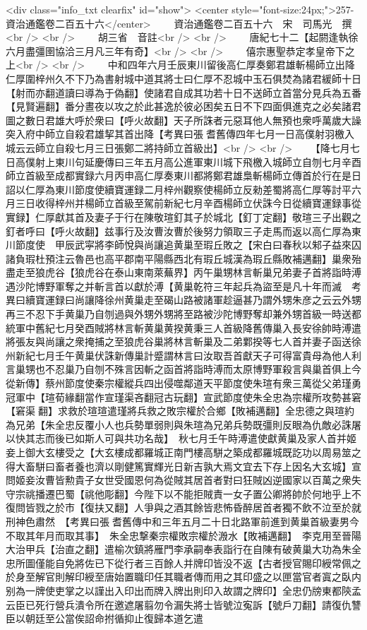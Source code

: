 <div class="info_txt clearfix" id="show">
<center style="font-size:24px;">257-資治通鑑卷二百五十六</center>
  　　資治通鑑卷二百五十六　宋　司馬光　撰<br />
<br />
　　胡三省　音註<br />
<br />
　　唐紀七十二【起閼逢執徐六月盡彊圉協洽三月凡三年有奇】<br />
<br />
　　僖宗惠聖恭定孝皇帝下之上<br />
<br />
　　中和四年六月壬辰東川留後高仁厚奏鄭君雄斬楊師立出降仁厚圍梓州久不下乃為書射城中道其將士曰仁厚不忍城中玉石俱焚為諸君緩師十日【射而亦翻道讀曰導為于偽翻】使諸君自成其功若十日不送師立首當分見兵為五番【見賢遍翻】番分晝夜以攻之於此甚逸於彼必困矣五日不下四面俱進克之必矣諸君圖之數日君雄大呼於衆曰【呼火故翻】天子所誅者元惡耳他人無預也衆呼萬歲大譟突入府中師立自殺君雄挈其首出降【考異曰張耆舊傳四年七月一日高僕射羽檄入城云云師立自殺七月三日張鄭二將持師立首級出】<br />
<br />
　　【降七月七日高僕射上東川句延慶傳曰三年五月高公進軍東川城下飛檄入城師立自刎七月辛酉師立首級至成都實録六月丙申高仁厚奏東川都將鄭君雄梟斬楊師立傳首於行在是日詔以仁厚為東川節度使續寶運録二月梓州觀察使楊師立反勑差蜀將高仁厚等討平六月三日收得梓州并楊師立首級至駕前新紀七月辛酉楊師立伏誅今日從續寶運録事從實録】仁厚獻其首及妻子于行在陳敬瑄釘其子於城北【釘丁定翻】敬瑄三子出觀之釘者呼曰【呼火故翻】兹事行及汝曹汝曹於後努力領取三子走馬而返以高仁厚為東川節度使　甲辰武寜將李師悅與尚讓追黄巢至瑕丘敗之【宋白曰春秋以邾子益來囚諸負瑕杜預注云魯邑也高平郡南平陽縣西北有瑕丘城漢為瑕丘縣敗補邁翻】巢衆殆盡走至狼虎谷【狼虎谷在泰山東南萊蕪界】丙午巢甥林言斬巢兄弟妻子首將詣時溥遇沙陀博野軍奪之并斬言首以獻於溥【黄巢乾符三年起兵為盜至是凡十年而滅　考異曰續寶運録曰尚讓降徐州黄巢走至碣山路被諸軍趁逼甚乃謂外甥朱彦之云云外甥再三不忍下手黄巢乃自刎過與外甥外甥將至路被沙陀博野奪却兼外甥首級一時送都統軍中舊紀七月癸酉賊將林言斬黄巢黄揆黄秉三人首級降舊傳巢入長安徐帥時溥遣將張友與尚讓之衆掩捕之至狼虎谷巢將林言斬巢及二弟鄴揆等七人首并妻子函送徐州新紀七月壬午黄巢伏誅新傳巢計蹙謂林言曰汝取吾首獻天子可得富貴母為他人利言巢甥也不忍巢乃自刎不殊言因斬之函首將詣時溥而太原博野軍殺言與巢首俱上今從新傳】蔡州節度使秦宗權縱兵四出侵噬鄰道天平節度使朱瑄有衆三萬從父弟瑾勇冠軍中【瑄荀緣翻當作宣瑾渠吝翻冠古玩翻】宣武節度使朱全忠為宗權所攻勢甚窘【窘渠翻】求救於瑄瑄遣瑾將兵救之敗宗權於合鄉【敗補邁翻】全忠德之與瑄約為兄弟【朱全忠反覆小人也兵勢單弱則與朱瑄為兄弟兵勢既彊則反眼為仇敵必誅屠以快其志而後已如斯人可與共功名哉】　秋七月壬午時溥遣使獻黄巢及家人首并姬妾上御大玄樓受之【大玄樓成都羅城正南門樓高駢之築成都羅城既訖功以周易筮之得大畜駢曰畜者養也濟以剛健篤實輝光日新吉孰大焉文宜去下存上因名大玄城】宣問姬妾汝曹皆勲貴子女世受國恩何為從賊其居首者對曰狂賊凶逆國家以百萬之衆失守宗祧播遷巴蜀【祧他彫翻】今陛下以不能拒賊責一女子置公卿將帥於何地乎上不復問皆戮之於市【復扶又翻】人爭與之酒其餘皆悲怖昏醉居首者獨不飲不泣至於就刑神色肅然　【考異曰張耆舊傳中和三年五月二十日北路軍前進到黄巢首級妻男今不取其年月而取其事】　朱全忠撃秦宗權敗宗權於溵水【敗補邁翻】　李克用至晉陽大治甲兵【治直之翻】遣榆次鎮將雁門李承嗣奉表詣行在自陳有破黄巢大功為朱全忠所圖僅能自免將佐已下從行者三百餘人并牌印皆没不返【古者授官賜印綬常佩之於身至解官則解印綬至唐始置職印任其職者傳而用之其印盛之以匣當官者寘之臥内别為一牌使吏掌之以謹出入印出而牌入牌出則印入故謂之牌印】全忠仍牓東都陝孟云臣已死行營兵潰令所在邀遮屠翦勿令漏失將士皆號泣寃訴【號戶刀翻】請復仇讐臣以朝廷至公當俟詔命拊循抑止復歸本道乞遣
